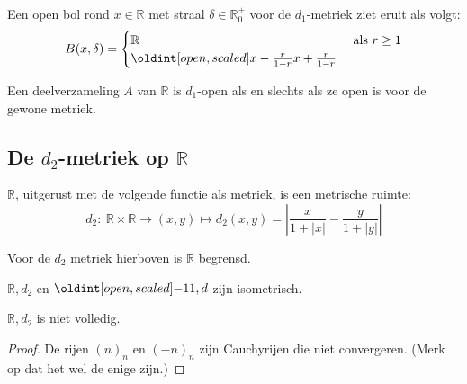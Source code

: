 \documentclass[main.tex]{subfiles}
\begin{document}
\begin{vb}
  Een open bol rond $x\in \mathbb{R}$ met straal $\delta\in \mathbb{R}_{0}^{+}$ voor de $d_{1}$-metriek ziet eruit als volgt:
  \[ B(x,\delta) = 
  \begin{cases}
    \mathbb{R} &\text{ als } r \ge 1\\
    \interval[open]{x-\frac{r}{1-r}}{x+\frac{r}{1-r}}
  \end{cases}
  \]
\end{vb}

\begin{st}
  Een deelverzameling $A$ van $\mathbb{R}$ is $d_{1}$-open als en slechts als ze open is voor de gewone metriek.
\end{st}

\subsection{De $d_2$-metriek op $\mathbb{R}$}
\label{sec:d_2-metriek-op}

\begin{vb}
  $\mathbb{R}$, uitgerust met de volgende functie als metriek, is een metrische ruimte:
  \[ d_{2}:\ \mathbb{R}\times\mathbb{R}\rightarrow (x,y) \mapsto d_{2}(x,y)=\left| \frac{x}{1+|x|} - \frac{y}{1+|y|} \right| \]
\end{vb}

\begin{st}
  Voor de $d_{2}$ metriek hierboven is $\mathbb{R}$ begrensd.
\end{st}



\begin{vb}
  $\mathbb{R},d_{2}$ en $\interval[open]{-1}{1},d$ zijn isometrisch.
\end{vb}

\begin{tvb}
  $\mathbb{R},d_{2}$ is niet volledig.
  
  \begin{proof}
    De rijen $(n)_{n}$ en $(-n)_{n}$ zijn Cauchyrijen die niet convergeren.
    (Merk op dat het wel de enige zijn.)
  \end{proof}
\end{tvb}
\end{document}
